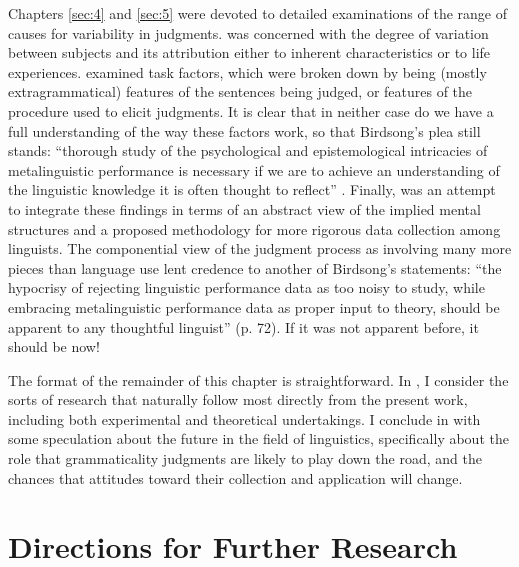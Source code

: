  Chapters \ref{sec:4} and \ref{sec:5} were devoted to detailed examinations of the range of causes for variability in judgments.  was concerned with the degree of variation between subjects and its attribution either to inherent characteristics or to life experiences.  examined task factors, which were broken down by being (mostly extragrammatical) features of the sentences being judged, or features of the procedure used to elicit judgments. It is clear that in neither case do we have a full understanding of the way these factors work, so that Birdsong's plea still stands: ``thorough study of the psychological and epistemological intricacies of metalinguistic performance is necessary if we are to achieve an understanding of the linguistic knowledge it is often thought to reflect'' \citep[49]{Birdsong1989}. Finally,  was an attempt to integrate these findings in terms of an abstract view of the implied mental structures and a proposed methodology for more rigorous data collection among linguists. The componential view of the judgment process as involving many more pieces than language use lent credence to another of Birdsong's statements: ``the hypocrisy of rejecting linguistic performance data as too noisy to study, while embracing metalinguistic performance data as proper input to theory, should be apparent to any thoughtful linguist'' (p. 72). If it was not apparent before, it should be now!


 The format of the remainder of this chapter is straightforward. In , I consider the sorts of research that naturally follow most directly from the present work, including both experimental and theoretical undertakings. I conclude in  with some speculation about the future in the field of linguistics, specifically about the role that grammaticality judgments are likely to play down the road, and the chances that attitudes toward their 
 collection and application will change. 

 \section{Directions for Further Research}\label{sec:7.2}

